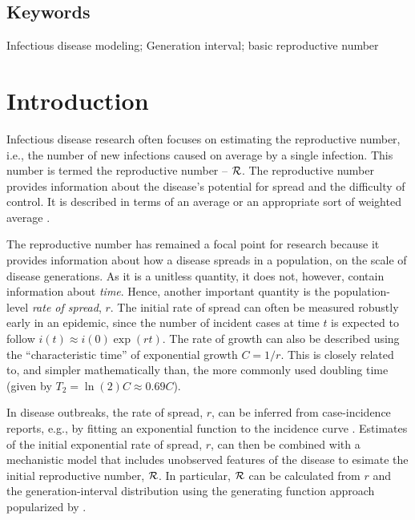 \documentclass[12pt]{article}
\newcommand{\RR}{\ensuremath{{\cal R}}}
\newcommand{\Tc}{\ensuremath{C}}
\begin{document}
\subsection*{Keywords}

Infectious disease modeling; Generation interval; basic reproductive number


\section{Introduction}

Infectious disease research often focuses on estimating the reproductive number, i.e., the number of new infections caused on average by a single infection.
This number is termed the reproductive number -- \RR.
The reproductive number provides information about the disease's potential for spread and the difficulty of control.
It is described in terms of an average \cite{AndeMay91} or an appropriate sort of weighted average \cite{DiekHees90}.

The reproductive number has remained a focal point for research because it provides information about how a disease spreads in a population, on the scale of disease generations.
As it is a unitless quantity, it does not, however, contain information about \emph{time}.
Hence, another important quantity is the population-level \emph{rate of spread}, $r$. The initial rate of spread can often be measured robustly 
early in an epidemic, since the number of incident cases at time $t$ is expected to follow $i(t) \approx i(0) \exp(r t)$. The rate of growth can also be described using the ``characteristic time'' of exponential growth $\Tc = 1/r$. This is closely related to, and simpler mathematically than, the more commonly used doubling time (given by $T_2 = \ln(2) \Tc \approx 0.69 \Tc$).

In disease outbreaks, the rate of spread, $r$, can be inferred from case-incidence reports, e.g., by fitting an exponential function to the incidence curve \cite{MillRobi04, NishCast09, MaJDush14}.
Estimates of the initial exponential rate of spread, $r$, can then be combined with a mechanistic model that includes unobserved features of the disease to esimate the initial reproductive number, \RR.
In particular, $\RR$ can be calculated from $r$ and the generation-interval distribution using the generating function approach popularized by \cite{WallLips07}.
\end{document}
